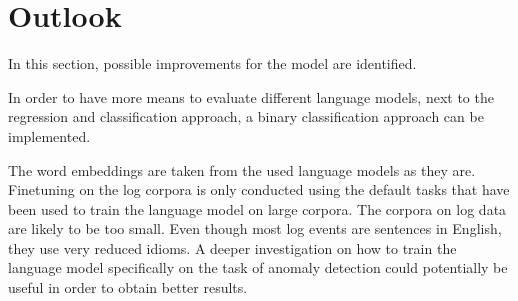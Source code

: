 


\section{Outlook\label{sec:outlook}}
In this section, possible improvements for the model are identified. 

In order to have more means to evaluate different language models, next to the regression and classification approach, a binary classification approach can be implemented.

The word embeddings are taken from the used language models as they are. Finetuning on the log corpora is only conducted using the default tasks that have been used to train the language model on large corpora. The corpora on log data are likely to be too small. Even though most log events are sentences in English, they use very reduced idioms. A deeper investigation on how to train the language model specifically on the task of anomaly detection could potentially be useful in order to obtain better results.

